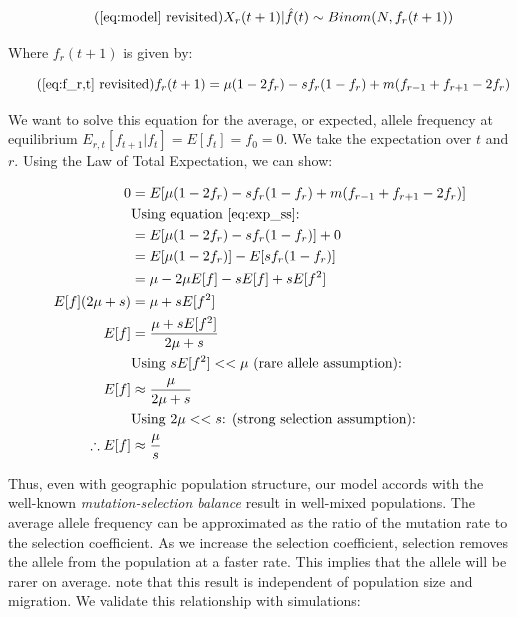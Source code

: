\begin{equation}
    \tag{\ref{eq:model} revisited}
    X_r(t+1) | \hat{f}(t) \sim Binom(N,f_r(t+1))
\end{equation}

Where $f_r(t+1)$ is given by:

\begin{equation}
    \tag{\ref{eq:f_r,t} revisited}
    f_r(t+1) = \mu(1-2f_r)-sf_r (1-f_r) + m (f_{r-1}+f_{r+1}-2f_r)
\end{equation}

We want to solve this equation for the average, or expected, allele frequency at equilibrium $E_{r,t}[f_{t+1} | f_t] = E[f_t] = f_0 = 0$. We take the expectation over $t$ and $r$. Using the Law of Total Expectation, we can show:

\begin{equation}
    \begin{split}
        0 &= E[\mu(1-2f_r)-sf_r (1-f_r ) + m (f_{r-1}+f_{r+1}-2f_r)] \\ 
        & \text{Using equation \ref{eq:exp_ss}:} \\
        &= E[\mu(1-2f_r)-sf_r (1-f_r )] + 0   \\
        &= E[\mu(1-2f_r)] - E[sf_r (1-f_r)] \\
        &= \mu - 2\mu E[f] - sE[f] + sE[f^2] \\
        E[f](2\mu + s) &= \mu + sE[f^2] \\
        E[f] &= \frac{\mu + sE[f^2]}{2\mu + s} \\
        & \text{Using $sE[f^2] << \mu$ (rare allele assumption):} \\
        E[f] &\approx  \frac{\mu}{2\mu + s}  \\
        & \text{Using $2\mu << s$: (strong selection assumption):} \\
        \therefore E[f] &\approx \frac{\mu}{s} 
    \end{split}
\end{equation}


Thus, even with geographic population structure, our model accords with the well-known \textit{mutation-selection balance} result \cite{fisher_genetical_1930} in well-mixed populations. The average allele frequency can be approximated as the ratio of the mutation rate to the selection coefficient. As we increase the selection coefficient, selection removes the allele from the population at a faster rate. This implies that the allele will be rarer on average. note that this result is independent of population size and migration. We validate this relationship with simulations:

